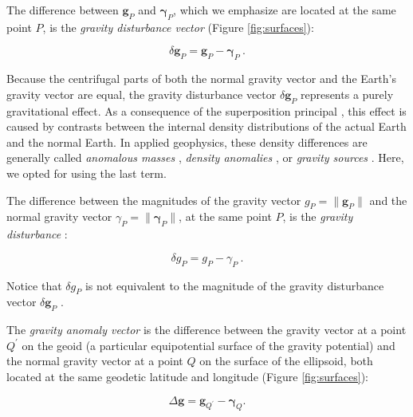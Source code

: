 \documentclass[manuscript]{geophysics}
\begin{document}
The difference between $\mathbf{g}_{P}$ and $\boldsymbol{\gamma}_{P}$,
which we emphasize are located at the same point $P$,
is the \textit{gravity disturbance vector} (Figure \ref{fig:surfaces}):

\begin{equation}
\delta \mathbf{g}_{P} =
\mathbf{g}_{P} - \boldsymbol{\gamma}_{P} \: .
\label{eq:gravity-disturbance-vector}
\end{equation}

Because the centrifugal parts of both the normal gravity vector
and the Earth's gravity vector are equal,
the gravity disturbance vector $\delta \mathbf{g}_{P}$
represents a purely gravitational effect.
As a consequence of the superposition principal \citep{blakely1996},
this effect is caused by contrasts between
the internal density distributions
of the actual Earth and the normal Earth.
In applied geophysics, these density differences are generally called
\textit{anomalous masses} \citep[e.g.,][]{hammer1945,lafehr1965},
\textit{density anomalies} \citep[e.g.,][]{forsberg1984},
or \textit{gravity sources} \citep[e.g.,][]{blakely1996}.
Here, we opted for using the last term.

The difference between the magnitudes of the gravity vector
$g_{P} = \| \mathbf{g}_{P} \|$ and the normal gravity vector
$\gamma_{P} = \| \boldsymbol{\gamma}_{P} \|$,
at the same point $P$, is the \textit{gravity disturbance}
\citep{heiskanen-moritz1967, hofmann-wellenhof-moritz2005}:

\begin{equation}
\delta g_{P} = g_{P} - \gamma_{P} \: .
\label{eq:gravity-disturbance}
\end{equation}

\noindent
Notice that $\delta g_{P}$ is not equivalent
to the magnitude of the gravity disturbance vector
$\delta \mathbf{g}_{P}$ \citep{barthelmes2013, sanso_sideris2013}.

The \textit{gravity anomaly vector}
is the difference between the gravity
vector at a point $Q^{\prime}$ on the geoid
(a particular equipotential surface of the gravity potential)
and the normal gravity vector at a point $Q$ on the surface of the ellipsoid,
both located at the same geodetic latitude and longitude
(Figure \ref{fig:surfaces}):

\begin{equation}
\Delta \mathbf{g} = \mathbf{g}_{Q^{\prime}} - \boldsymbol{\gamma}_{Q} .
\label{eq:gravity-anomaly-vector}
\end{equation}
\end{document}
